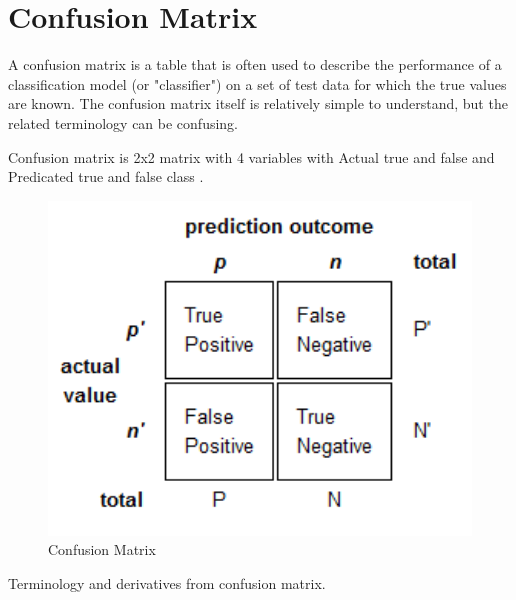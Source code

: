 \section{Confusion Matrix}
A confusion matrix is a table that is often used to describe the performance of a classification model (or "classifier") on a set of test data for which the true values are known. The confusion matrix itself is relatively simple to understand, but the related terminology can be confusing.	
\par 
Confusion matrix is 2x2 matrix with 4 variables with Actual true and false and Predicated true and false class .

\begin{figure}[tbh] %
\begin{large}
	\includegraphics[width=6in]{images/confusionmatrix.png}
	\caption{Confusion Matrix} %
	\label{Confusion matrix} %
\end{large}
\end{figure} 
\par
Terminology and derivatives from confusion matrix.

